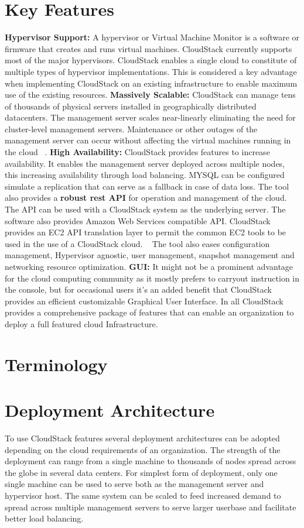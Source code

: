 \section{Key Features}
{\bf Hypervisor Support: } A hypervisor or Virtual Machine Monitor is a software or firmware that creates 
and runs virtual machines. CloudStack currently supports most of the major hypervisors.  CloudStack enables 
a single cloud to constitute of multiple types of hypervisor implementations. This is considered a key 
advantage when implementing CloudStack on an existing infrastructure to enable maximum use of the existing 
resources. {\bf Massively Scalable:} CloudStack can manage tens of thousands of physical servers installed
in geographically distributed datacenters. The management server scales near-linearly eliminating the need for
cluster-level management servers. Maintenance or other outages of the management server can occur without
affecting the virtual machines running in the cloud ~\cite{hid-sp18-417-www-cloudstack-scalability}. 
{\bf High Availability:} CloudStack provides features to increase availability. It enables the management server 
deployed across multiple nodes, this increasing availability through load balancing. MYSQL can be configured
simulate a replication that can serve as a fallback in case of data loss. The tool also provides a {\bf robust rest API} 
for operation and management of the cloud. The API can be used with a CloudStack system as the underlying server. 
The software also provides Amazon Web Services compatible API. CloudStack provides an EC2 API translation layer
to permit the common EC2 tools to be used in the use of a CloudStack cloud. ~\cite{hid-sp18-417-www-cloudstack-aws}
The tool also eases configuration management, Hypervisor agnostic, user management, snapshot management and 
networking resource optimization. 
{\bf GUI: } It might not be a prominent advantage for the cloud computing community as it mostly prefers to carryout 
instruction in the console, but for occasional users it’s an added benefit that CloudStack provides an efficient 
customizable Graphical User Interface. In all CloudStack provides a comprehensive package of features that can enable 
an organization to deploy a full featured cloud Infrastructure.

\section{Terminology}

\section{Deployment Architecture}
To use CloudStack features several deployment architectures can be adopted depending on the cloud requirements of an
organization. The strength of the deployment can range from a single machine to thousands of nodes spread across the 
globe in several data centers. For simplest form of deployment, only one single machine can be used to serve both as 
the management server and hypervisor host. The same system can be scaled to feed increased demand to spread across 
multiple management servers to serve larger userbase and facilitate better load balancing. 


